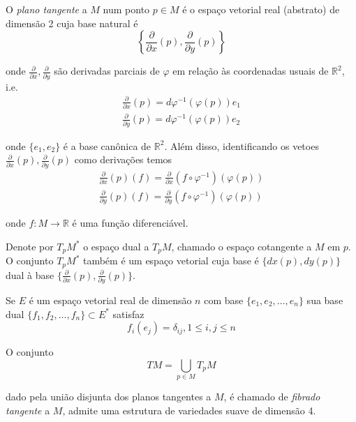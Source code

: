 \begin{defi}
	O \emph{plano tangente} a $M$ num ponto $p \in M$ é o espaço vetorial real (abstrato) de dimensão 2 cuja base natural é
	\begin{equation*}
		\left\{ \frac{\partial}{\partial x} (p), \frac{\partial}{\partial y} (p) \right\}
	\end{equation*}
	
	onde $\frac{\partial}{\partial x}, \frac{\partial}{\partial y}$ são derivadas parciais de $\varphi$ em relação às coordenadas usuais de $\mathbb{R}^2$, i.e.
	\begin{align*}
		\frac{\partial}{\partial x} (p) = d \varphi^{-1} ( \varphi(p) ) e_1\\
		\frac{\partial}{\partial y} (p) = d \varphi^{-1} ( \varphi(p) ) e_2
	\end{align*}
	
	onde $\{ e_1,e_2 \}$ é a base canônica de $\mathbb{R}^2$. Além disso, identificando os vetoes $\frac{\partial}{\partial x} (p), \frac{\partial}{\partial y} (p)$ como derivações temos
	\begin{align*}
		\frac{\partial}{\partial x} (p) (f) = \frac{\partial}{\partial x} \left( f \circ \varphi^{-1} \right) (\varphi(p))\\
		\frac{\partial}{\partial y} (p) (f) = \frac{\partial}{\partial y} \left( f \circ \varphi^{-1} \right) (\varphi(p))
	\end{align*}
	
	onde $f: M \rightarrow \mathbb{R}$ é uma função diferenciável.
\end{defi}

\begin{obse}
	Denote por $T_p M^*$ o espaço dual a $T_p M$, chamado o espaço cotangente a $M$ em $p$. O conjunto $T_p M^*$ também é um espaço vetorial cuja base é $\{ dx(p), dy(p)  \}$ dual à base $\{ \frac{\partial}{\partial x}(p), \frac{\partial}{\partial y}(p) \}$.
\end{obse}

\begin{lembrete}
	Se $E$ é um espaço vetorial real de dimensão $n$ com base $\{ e_1, e_2, \ldots, e_n \}$ sua base dual $\{ f_1, f_2, \ldots, f_n \} \subset E^*$ satisfaz
	\begin{equation*}
		f_i (e_j) = \delta_{ij}, 1 \leq i,j \leq n
	\end{equation*}
\end{lembrete}

	O conjunto
	\begin{equation*}
		TM = \bigcup_{p \in M} T_p M
	\end{equation*}
	
	dado pela união disjunta dos planos tangentes a $M$, é chamado de \emph{fibrado tangente} a $M$, admite uma estrutura de variedades suave de dimensão 4.